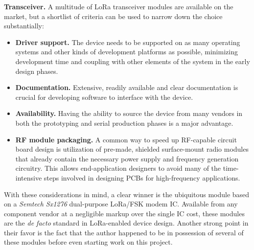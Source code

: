 \documentclass[10pt,nocopyrightspace]{ewsn-proc}
\begin{document}
\textbf{Transceiver.} A multitude of LoRa transceiver modules are available on the market, but a shortlist of criteria can be used to narrow down the choice substantially:
\begin{itemize}
\item \textbf{Driver support.} The device needs to be supported on as many operating systems and other kinds of development platforms as possible, minimizing development time and coupling with other elements of the system in the early design phases.
\item \textbf{Documentation.}  Extensive, readily available and clear documentation is crucial for developing software to interface with the device.
\item \textbf{Availability.}  Having the ability to source the device from many vendors in both the prototyping and serial production phases is a major advantage.
\item \textbf{RF module packaging.} A common way to speed up RF-capable circuit board design is utilization of pre-made, shielded surface-mount radio modules that already contain the necessary power supply and frequency generation circuitry. This allows end-application designers to avoid many of the time-intensive steps involved in designing PCBs for high-frequency applications.
\end{itemize}

With these considerations in mind, a clear winner is the ubiquitous module based on a \textit{Semtech Sx1276} dual-purpose LoRa/FSK modem IC. Available from any component vendor at a negligible markup over the single IC cost, these modules are the \textit{de facto} standard in LoRa-enabled device design. Another strong point in their favor is the fact that the author happened to be in possession of several of these modules before even starting work on this project.
\end{document}
